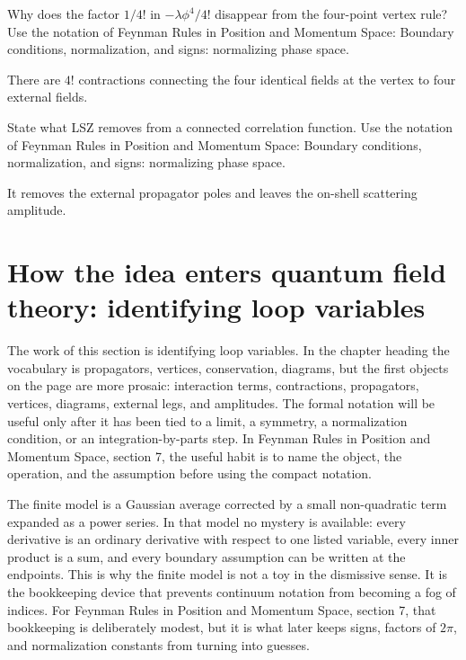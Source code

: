 \begin{exercise}
Why does the factor \(1/4!\) in \(-\lambda\phi^4/4!\) disappear from the four-point vertex rule?  Use the notation of Feynman Rules in Position and Momentum Space: Boundary conditions, normalization, and signs: normalizing phase space.
\begin{answer}
There are \(4!\) contractions connecting the four identical fields at the vertex to four external fields.
\end{answer}
\end{exercise}

\begin{exercise}
State what LSZ removes from a connected correlation function.  Use the notation of Feynman Rules in Position and Momentum Space: Boundary conditions, normalization, and signs: normalizing phase space.
\begin{answer}
It removes the external propagator poles and leaves the on-shell scattering amplitude.
\end{answer}
\end{exercise}



\section{How the idea enters quantum field theory: identifying loop variables}

The work of this section is identifying loop variables.  In the chapter heading the vocabulary is propagators, vertices, conservation, diagrams, but the first objects on the page are more prosaic: interaction terms, contractions, propagators, vertices, diagrams, external legs, and amplitudes.  The formal notation will be useful only after it has been tied to a limit, a symmetry, a normalization condition, or an integration-by-parts step.  In Feynman Rules in Position and Momentum Space, section 7, the useful habit is to name the object, the operation, and the assumption before using the compact notation.

The finite model is a Gaussian average corrected by a small non-quadratic term expanded as a power series.  In that model no mystery is available: every derivative is an ordinary derivative with respect to one listed variable, every inner product is a sum, and every boundary assumption can be written at the endpoints.  This is why the finite model is not a toy in the dismissive sense.  It is the bookkeeping device that prevents continuum notation from becoming a fog of indices.  For Feynman Rules in Position and Momentum Space, section 7, that bookkeeping is deliberately modest, but it is what later keeps signs, factors of \(2\pi\), and normalization constants from turning into guesses.

